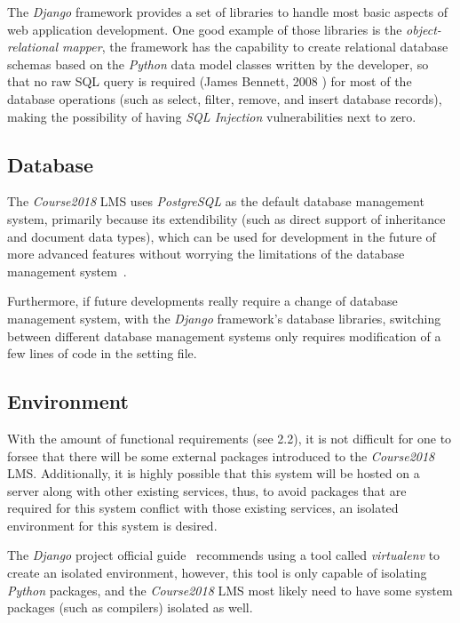 The \emph{Django} framework provides a set of libraries to handle most basic
aspects of web application development. One good example of those libraries is
the \emph{object-relational mapper}, the framework has the capability to create
relational database schemas based on the \emph{Python} data model classes
written by the developer, so that no raw SQL query is required
(James Bennett, 2008 \cite{django}) for most of the
database operations (such as select, filter, remove, and insert database
records),
making the possibility of having \emph{SQL Injection} vulnerabilities next
to zero.

\subsection{Database}
The \emph{Course2018} LMS uses \emph{PostgreSQL} as the default database
management system, primarily because its extendibility (such as direct
support of inheritance and document data types), which can be used for
development in the future of more advanced features without worrying the
limitations of the database management system~\cite{postgres}.

\medskip

Furthermore, if future developments really require a change of database
management system,
with the \emph{Django} framework's database libraries,
switching between different database management systems only requires
modification of a few lines of code in the setting file.

\subsection{Environment}
With the amount of functional requirements (see 2.2), it is not difficult for
one to forsee that there will be some external packages introduced to the
\emph{Course2018} LMS.
Additionally, it is highly possible that this system will be hosted
on a server along with other existing services, thus, to avoid packages that
are required for this system conflict with those existing services, an
isolated environment for this system is desired.

\medskip
The \emph{Django} project official guide~\cite{djangoGuide} recommends using
a tool called \emph{virtualenv} to create an isolated environment, however,
this tool is only capable of isolating \emph{Python} packages, and the
\emph{Course2018} LMS most likely need to have some system packages (such as
compilers) isolated as well.

